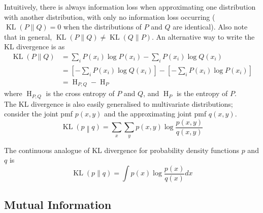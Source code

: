 \documentclass[11pt]{report} %
\begin{document}
Intuitively, there is always information loss when approximating one distribution with another distribution, with only no information loss occurring ($\operatorname{KL}\left(P\|Q\right) = 0$ when the distributions of $P$ and $Q$ are identical). Also note that in general, $\operatorname{KL}\left(P\|Q\right) \neq \operatorname{KL}\left(Q\|P\right)$. An alternative way to write the KL divergence is as
\begin{align}
\operatorname{KL}\left(P\|Q\right) &= \sum_{i}P\left(x_{i}\right)\log P\left(x_{i}\right) - \sum_{i}P\left(x_{i}\right)\log Q\left(x_{i}\right) \\
&= \left[- \sum_{i}P\left(x_{i}\right)\log Q\left(x_{i}\right)\right] - \left[-\sum_{i}P\left(x_{i}\right)\log P\left(x_{i}\right)\right] \\
&= \operatorname{H}_{P, Q} - \operatorname{H}_{P}
\end{align}
where $\operatorname{H}_{P, Q}$ is the cross entropy of $P$ and $Q$, and $\operatorname{H}_{P}$ is the entropy of $P$. \\

The KL divergence is also easily generalised to multivariate distributions; consider the joint pmf $p\left(x, y\right)$ and the approximating joint pmf $q\left(x, y\right)$.
\begin{equation}
\operatorname{KL}\left(p\middle\Vert q\right) = \sum_{x}\sum_{y}p\left(x, y\right)\log\dfrac{p\left(x, y\right)}{q\left(x, y\right)}
\end{equation}

The continuous analogue of KL divergence for probability density functions $p$ and $q$ is
\begin{equation}
\operatorname{KL}\left(p\|q\right) = \int p\left(x\right)\log\dfrac{p\left(x\right)}{q\left(x\right)}dx
\end{equation}

\subsection{Mutual Information}
\end{document}
